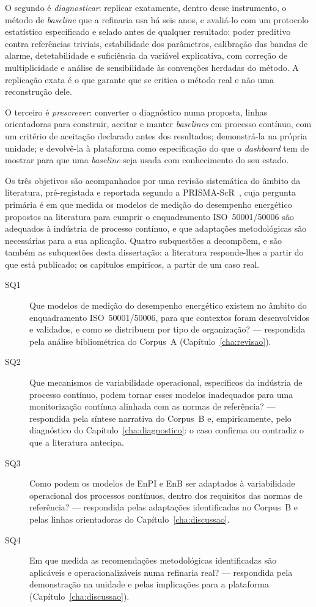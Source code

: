 O segundo é \emph{diagnosticar}: replicar exatamente, dentro desse
instrumento, o método de \emph{baseline} que a refinaria usa há seis
anos, e avaliá-lo com um protocolo estatístico especificado e selado
antes de qualquer resultado: poder preditivo contra referências
triviais, estabilidade dos parâmetros, calibração das bandas de alarme,
detetabilidade e suficiência da variável explicativa, com correção de
multiplicidade e análise de sensibilidade às convenções herdadas do
método. A replicação exata é o que garante que se critica o método real
e não uma reconstrução dele.

O terceiro é \emph{prescrever}: converter o diagnóstico numa proposta,
linhas orientadoras para construir, aceitar e manter \emph{baselines}
em processo contínuo, com um critério de aceitação declarado antes dos
resultados; demonstrá-la na própria unidade; e devolvê-la à plataforma como especificação do que o \emph{dashboard}
tem de mostrar para que uma \emph{baseline} seja usada com conhecimento
do seu estado.

Os três objetivos são acompanhados por uma revisão sistemática do
âmbito da literatura, pré-registada e reportada segundo a
PRISMA-ScR~\cite{Tricco2018}, cuja pergunta primária
é em que medida os modelos de medição do desempenho energético
propostos na literatura para cumprir o enquadramento ISO~50001/50006
são adequados à indústria de processo contínuo, e que adaptações
metodológicas são necessárias para a sua aplicação. Quatro subquestões
a decompõem, e são também as subquestões desta dissertação: a
literatura responde-lhes a partir do que está publicado; os capítulos
empíricos, a partir de um caso real.

\begin{description}
  \item[SQ1] Que modelos de medição do desempenho energético existem no
    âmbito do enquadramento ISO~50001/50006, para que contextos foram
    desenvolvidos e validados, e como se distribuem por tipo de
    organização? --- respondida pela análise bibliométrica do Corpus~A
    (Capítulo~\ref{cha:revisao}).
  \item[SQ2] Que mecanismos de variabilidade operacional, específicos da
    indústria de processo contínuo, podem tornar esses modelos
    inadequados para uma monitorização contínua alinhada com as normas
    de referência? --- respondida pela síntese narrativa do Corpus~B e,
    empiricamente, pelo diagnóstico do Capítulo~\ref{cha:diagnostico}: o
    caso confirma ou contradiz o que a literatura antecipa.
  \item[SQ3] Como podem os modelos de EnPI e EnB ser adaptados à
    variabilidade operacional dos processos contínuos, dentro dos
    requisitos das normas de referência? --- respondida pelas
    adaptações identificadas no Corpus~B e pelas linhas orientadoras do
    Capítulo~\ref{cha:discussao}.
  \item[SQ4] Em que medida as recomendações metodológicas identificadas
    são aplicáveis e operacionalizáveis numa refinaria real? ---
    respondida pela demonstração na unidade e pelas implicações para a
    plataforma (Capítulo~\ref{cha:discussao}).
\end{description}

